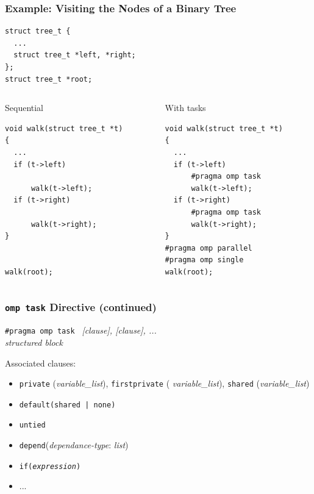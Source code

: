 \documentclass{beamer}
\begin{document}
\begin{frame}[fragile=singleslide]
  \frametitle{Example: Visiting the Nodes of a Binary Tree}

\begin{verbatim}
struct tree_t {
  ...
  struct tree_t *left, *right;
};
struct tree_t *root;
\end{verbatim}

\begin{columns}[T]
  \begin{column}{0.49\textwidth}
    \begin{block}{Sequential}
\begin{verbatim}
void walk(struct tree_t *t)
{
  ...
  if (t->left) 

      walk(t->left);
  if (t->right) 

      walk(t->right);
}


walk(root);
\end{verbatim}
    \end{block}
  \end{column}

  \begin{column}{0.49\textwidth}
    \begin{block}{With tasks\phantom{Sq}}
\begin{verbatim}
void walk(struct tree_t *t)
{
  ...
  if (t->left) 
      #pragma omp task
      walk(t->left);
  if (t->right) 
      #pragma omp task
      walk(t->right);
}
#pragma omp parallel
#pragma omp single
walk(root);
\end{verbatim}
    \end{block}
  \end{column}
\end{columns}
\end{frame}


\begin{frame}
  \frametitle{\texttt{omp task} Directive (continued)}

  \begin{framed}
  {\tt \#pragma omp task } {\it [clause], [clause], ...}  \\
  {\it structured block} 
\end{framed}

\medskip

Associated clauses:
  \begin{itemize}
  \item  {\tt private} ({\it variable\_list}), {\tt firstprivate} ({\it
      variable\_list}), {\tt shared} ({\it variable\_list})
  \item {\tt default(shared | none)}
  \item {\tt untied}
  \item {\tt depend}({\it dependance-type}: {\it list})
  \item {\tt if({\it expression})}
  \item ...
  \end{itemize}  
\end{frame}
\end{document}
